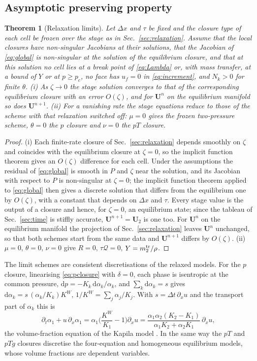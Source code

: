 \documentclass[a4paper,fleqn]{cas-sc}
\newtheorem{theorem}{Theorem}
\begin{document}
\subsection{Asymptotic preserving property}
\label{sec:ap}
\begin{theorem}[Relaxation limits]\label{thm:limits}
Let $\Delta x$ and $\tau$ be fixed and the closure type of each cell be frozen over the stage as in Sec.~\ref{sec:relaxation}. Assume that
the local closures have non-singular Jacobians at their solutions, that the Jacobian of \eqref{eq:global} is non-singular at the
solution of the equilibrium closure, and that at this solution no cell lies at a break point of \eqref{eq:Lambda} or, with mass transfer, at a bound of $Y$
or at $p\ge p_c$, no face has $u_f=0$ in \eqref{eq:increment}, and $N_k>0$ for finite $\theta$. (i) As $\zeta\to0$ the stage solution converges to that of the
corresponding equilibrium closure with an error $O(\zeta)$, and for $\mathbf U^n$ on the equilibrium manifold so does $\mathbf U^{n+1}$.
(ii) For a vanishing rate the stage equations reduce to those of the scheme with that relaxation switched off: $\mu=0$ gives
the frozen two-pressure scheme, $\theta=0$ the $p$ closure and $\nu=0$ the $pT$ closure.
\end{theorem}
\begin{proof}
(i) Each finite-rate closure of Sec.~\ref{sec:relaxation} depends smoothly on $\zeta$ and coincides with the equilibrium
closure at $\zeta=0$, so the implicit function theorem gives an $O(\zeta)$ difference for each cell. Under the assumptions the
residual of \eqref{eq:global} is smooth in $P$ and $\zeta$ near the solution, and its Jacobian with respect to $P$ is non-singular at $\zeta=0$; the implicit function theorem applied to
\eqref{eq:global} then gives a discrete solution that differs from the equilibrium one by $O(\zeta)$, with a constant that depends on
$\Delta x$ and $\tau$. Every stage value is the output of a closure and hence,
for $\zeta=0$, an equilibrium state; since the tableau of Sec.~\ref{sec:time} is stiffly accurate, $\mathbf U^{n+1}=\mathbf U_2$ is one too. For $\mathbf U^n$ on the equilibrium manifold
the projection of Sec.~\ref{sec:relaxation} leaves $\mathbf U^n$ unchanged, so that both schemes start from the same data and $\mathbf U^{n+1}$ differs by $O(\zeta)$.
(ii) $\mu=0$, $\theta=0$, $\nu=0$ give $R=0$, $\tau\mathcal Q=0$, $Y=m^{\rm tr}_2/\rho$.
\end{proof}
The limit schemes are consistent discretisations of the relaxed models. For the $p$ closure, linearising
\eqref{eq:pclosure} with $\delta=0$, each phase is isentropic at the common pressure, $\mathrm dp=-K_k\,\mathrm d\alpha_k/\alpha_k$, and $\sum_k\mathrm d\alpha_k=s$ gives
$\mathrm d\alpha_k=s\,(\alpha_k/K_k)K^W$, $1/K^W=\sum_j\alpha_j/K_j$. With $s=\Delta t\,\partial_xu$ and the transport part of $\alpha_k$ this is
\[
\partial_t\alpha_1+u\,\partial_x\alpha_1=\alpha_1\Big(\frac{K^W}{K_1}-1\Big)\partial_xu=\frac{\alpha_1\alpha_2(K_2-K_1)}{\alpha_1K_2+\alpha_2K_1}\,\partial_xu ,
\]
the volume-fraction equation of the Kapila model \cite{Kapila2001,Pelanti2022}. In the same way the $pT$
and $pTg$ closures discretise the four-equation and homogeneous equilibrium models, whose volume fractions are dependent variables.
\end{document}
